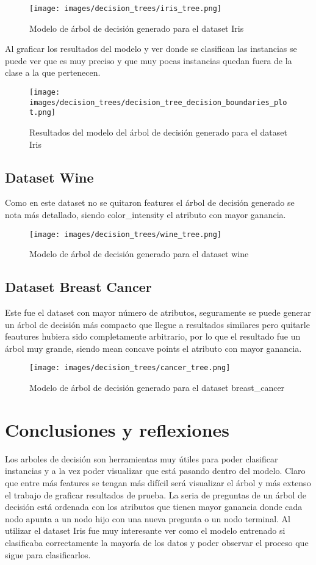 \documentclass[sigconf,authorversion,nonacm]{acmart}
\begin{document}
\begin{figure}[H]
  \centering
  \texttt{[image: images/decision\_trees/iris\_tree.png]}
  \caption{Modelo de árbol de decisión generado para el dataset Iris}
\end{figure}

Al graficar los resultados del modelo y ver donde se clasifican las instancias se puede ver que es muy preciso y que muy pocas instancias quedan fuera de la clase a la que pertenecen.

\begin{figure}[H]
  \centering
  \texttt{[image: images/decision\_trees/decision\_tree\_decision\_boundaries\_plot.png]}
  \caption{Resultados del modelo del árbol de decisión generado para el dataset Iris}
\end{figure}


\subsection{Dataset Wine}
Como en este dataset no se quitaron features el árbol de decisión generado se nota más detallado, siendo color\_intensity el atributo con mayor ganancia.

\begin{figure}[H]
  \centering
  \texttt{[image: images/decision\_trees/wine\_tree.png]}
  \caption{Modelo de árbol de decisión generado para el dataset wine}
\end{figure}

\subsection{Dataset Breast Cancer}
Este fue el dataset con mayor número de atributos, seguramente se puede generar un árbol de decisión más compacto que llegue a resultados similares pero quitarle feautures hubiera sido completamente arbitrario, por lo que el resultado fue un árbol muy grande, siendo mean concave points el atributo con mayor ganancia.

\begin{figure}[H]
  \centering
  \texttt{[image: images/decision\_trees/cancer\_tree.png]}
  \caption{Modelo de árbol de decisión generado para el dataset breast\_cancer}
\end{figure}


\section{Conclusiones y reflexiones}
Los arboles de decisión son herramientas muy útiles para poder clasificar instancias y a la vez poder visualizar que está pasando dentro del modelo. Claro que entre más features se tengan más difícil será visualizar el árbol y más extenso el trabajo de graficar resultados de prueba. La seria de preguntas de un árbol de decisión está ordenada con los atributos que tienen mayor ganancia donde cada nodo apunta a un nodo hijo con una nueva pregunta o un nodo terminal.
Al utilizar el dataset Iris fue muy interesante ver como el modelo entrenado si clasificaba correctamente la mayoría de los datos y poder observar el proceso que sigue para clasificarlos.
\end{document}
